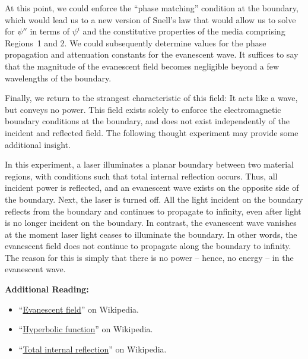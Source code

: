 At this point, we could enforce the ``phase matching'' condition at the boundary, which would lead us to a new version of Snell's law 
that would allow us to solve for $\psi''$ in terms of $\psi^i$ and the constitutive properties of the media comprising Regions~1 and 2.
We could subsequently determine values for the phase propagation and attenuation constants for the evanescent wave.
It suffices to say that the magnitude of the evanescent field becomes negligible beyond a few wavelengths of the boundary.

Finally, we return to the strangest characteristic of this field:  It acts like a wave, but conveys no power. 
This field exists solely to enforce the electromagnetic boundary conditions at the boundary, and does not exist independently of the incident and reflected field.  
The following thought experiment may provide some additional insight.

In this experiment, a laser illuminates a planar boundary between two material regions, with conditions such that total internal reflection occurs.  Thus, all incident power is reflected, and an evanescent wave exists on the opposite side of the boundary.  
Next, the laser is turned off.  
All the light incident on the boundary reflects from the boundary and continues to propagate to infinity, even after light is no longer incident on the boundary.  In contrast, the evanescent wave vanishes at the moment laser light ceases to illuminate the boundary.  In other words, the evanescent field does not continue to propagate along the boundary to infinity.  The reason for this is simply that there is no power -- hence, no energy -- in the evanescent wave. 
  

{\bf Additional Reading:}
\begin{itemize}
\item ``\href{https://en.wikipedia.org/wiki/Evanescent_field}{Evanescent field}'' on Wikipedia.
\item ``\href{https://en.wikipedia.org/wiki/Hyperbolic_function}{Hyperbolic function}'' on Wikipedia.
\item ``\href{https://en.wikipedia.org/wiki/Total_internal_reflection}{Total internal reflection}'' on Wikipedia.
\end{itemize}


